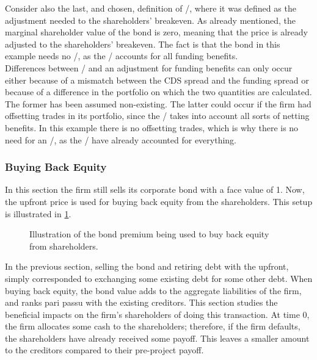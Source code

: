 \documentclass[main.tex]{subfiles}
\begin{document}
            Consider also the last, and chosen, definition of \FVA/,
            where it was defined as the adjustment needed to the shareholders' breakeven.
            As already mentioned, the marginal shareholder value of the bond is zero,
            meaning that the price is already adjusted to the shareholders' breakeven.
            The fact is that the bond in this example needs no \FVA/,
            as the \DVA/ accounts for all funding benefits.
            \\
            Differences between \DVA/ and an adjustment for funding benefits can only occur 
            either because of a mismatch between the CDS spread and the funding spread
            or because of a difference in the portfolio on which the two quantities are calculated. 
            The former has been assumed non-existing.
            The latter could occur if the firm had offsetting trades in its portfolio,
            since the \FVA/ takes into account all sorts of netting benefits.
            In this example there is no offsetting trades, 
            which is why there is no need for an \FVA/, as the \DVA/ have already accounted for everything.

        \subsubsection{Buying Back Equity}
            In this section the firm still sells its corporate bond with a face value of \num{1}.
            Now, the upfront price is used for buying back equity from the shareholders.
            This setup is illustrated in \cref{fig:equity-buyback-setup}.

            \begin{figure}[t]
                \centering
                \caption{Illustration of the bond premium being used to buy back equity from shareholders.}
                \label{fig:equity-buyback-setup}
            \end{figure}
           
            In the previous section, selling the bond and retiring debt with the upfront,
            simply corresponded to exchanging some existing debt for some other debt. 
            When buying back equity, the bond value adds to the aggregate liabilities of the firm, 
            and ranks pari passu with the existing creditors.
            This section studies the beneficial impacts on the firm's shareholders of doing this transaction.
            At time 0, the firm allocates some cash to the shareholders;
            therefore, if the firm defaults, the shareholders have already received some payoff.
            This leaves a smaller amount to the creditors compared to their pre-project payoff.
\end{document}
